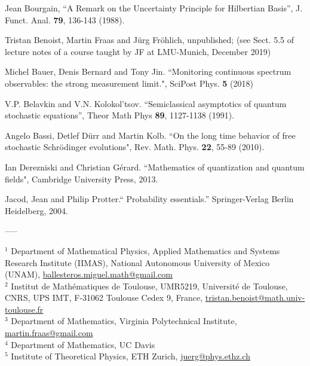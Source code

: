\documentclass[12pt]{article}
\begin{document}
\begin{thebibliography}{References}
 Jean Bourgain, ``A Remark on the Uncertainty Principle for Hilbertian Basis'', J. Funct. Anal. {\bf{79}}, 136-143 (1988).

 Tristan Benoist, Martin Fraas and J\"urg Fr\"ohlich, unpublished; (see Sect. 5.5 of lecture notes of a course taught by JF at LMU-Munich, December 2019)

 Michel Bauer, Denis Bernard and Tony Jin. ``Monitoring continuous spectrum observables: the strong measurement limit.", SciPost Phys. {\bf{5}} (2018)

  V.P. Belavkin and V.N. Kolokol'tsov. ``Semiclassical asymptotics of quantum stochastic equations'', Theor Math Phys {\bf{89}}, 1127-1138 (1991).

 Angelo Bassi, Detlef D\"{u}rr and Martin Kolb. ``On the long time behavior of free stochastic Schr\"{o}dinger evolutions", Rev. Math. Phys. {\bf{22}}, 55-89 (2010).

 Ian Derezniski and Christian G\'erard. ``Mathematics of quantization and quantum fields", Cambridge University Press, 2013.

 Jacod, Jean and Philip Protter.`` Probability essentials.'' Springer-Verlag Berlin Heidelberg, 2004.
\end{thebibliography}

\begin{center}
-----
\end{center}


\bigskip


\noindent
$^{1}$ Department of Mathematical Physics, Applied Mathematics and Systems Research Institute (IIMAS),
National Autonomous University of Mexico (UNAM), \href{mailto:ballesteros.miguel.math@gmail.com}{ballesteros.miguel.math@gmail.com}
\\[0.3em]
$^{2}$ Institut de Mathématiques de Toulouse, UMR5219, Université de Toulouse, CNRS, UPS IMT, F-31062 Toulouse Cedex 9, France, \href{mailto:tristan.benoist@math.univ-toulouse.fr}{tristan.benoist@math.univ-toulouse.fr}
\\[0.3em]
$^{3}$ Department of Mathematics, Virginia Polytechnical Institute, \href{mailto:martin.fraas@gmail.com}{martin.fraas@gmail.com}
\\[0.3em]
$^{4}$ Department of Mathematics, UC Davis
\\[0.3em]
$^{5}$ Institute of Theoretical Physics, ETH Zurich, \href{mailto:juerg@phys.ethz.ch}{juerg@phys.ethz.ch}
\end{document}
